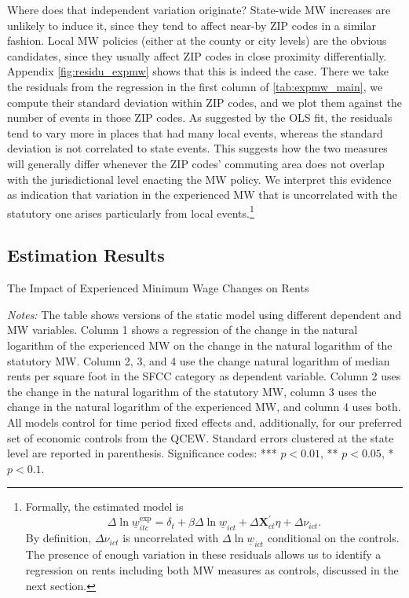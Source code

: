 Where does that independent 
variation originate? State-wide MW increases are unlikely to induce it, since they tend to 
affect near-by ZIP codes in a similar fashion. Local MW policies (either at the county or city
levels) are the obvious candidates, since they usually affect ZIP codes in close proximity 
differentially. Appendix \autoref{fig:residu_expmw} shows that this is indeed the case. 
There we take the residuals from the regression in the first column of 
\autoref{tab:expmw_main}, we compute their standard deviation within ZIP codes, and we plot 
them against the number of events in those ZIP codes. As suggested by the OLS fit, the residuals
tend to vary more in places that had many local events, whereas the standard deviation is not 
correlated to state events. This suggests how the two measures will generally differ whenever the 
ZIP codes' commuting area does not overlap with the jurisdictional level enacting the MW 
policy. We interpret this evidence as indication that variation in the 
experienced MW that is uncorrelated with the statutory one arises particularly from local 
events.\footnote{Formally, the estimated model is 
	$$ \Delta \ln \underline{w}_{itc}^{\text{exp}} = \delta_t 
				+ \beta \Delta \ln \underline{w}_{ict} + \Delta \mathbf{X}^{'}_{ct} \eta 
				+ \Delta \nu_{ict} . $$
	By definition, $\Delta \nu_{ict}$ is uncorrelated with $\Delta \ln \underline{w}_{ict}$ 
	conditional on the controls. The presence of enough variation in these residuals allows us
	to identify a regression on rents including both MW measures as controls, discussed in the
	next section.}


\subsection{Estimation Results}
\begin{table}[htb!]\centering
	\caption{The Impact of Experienced Minimum Wage Changes on Rents}
	\label{tab:expmw_main}
	
	\begin{minipage}{0.95\textwidth}\footnotesize
		\vspace{3mm}	
		\textit{Notes:} The table shows versions of the static model using different 
		dependent and MW variables. Column 1 shows a regression of the change in the natural 
		logarithm of the experienced MW on the change in the natural logarithm of the 
		statutory MW. Column 2, 3, and 4 use the change natural logarithm of median rents per 
		square foot in the SFCC category as dependent variable. Column 2 uses the change in 
		the natural logarithm of the statutory MW, column 3 uses the change in the natural 
		logarithm of the experienced MW, and column 4 uses both. All models control for time 
		period fixed effects and, additionally, for our preferred set of economic controls 
		from the QCEW. 
		Standard errors clustered at the state level are reported in parenthesis. Significance 
		codes: *** $p < 0.01$, ** $p < 0.05$, * $p < 0.1$.
	\end{minipage}
\end{table}

